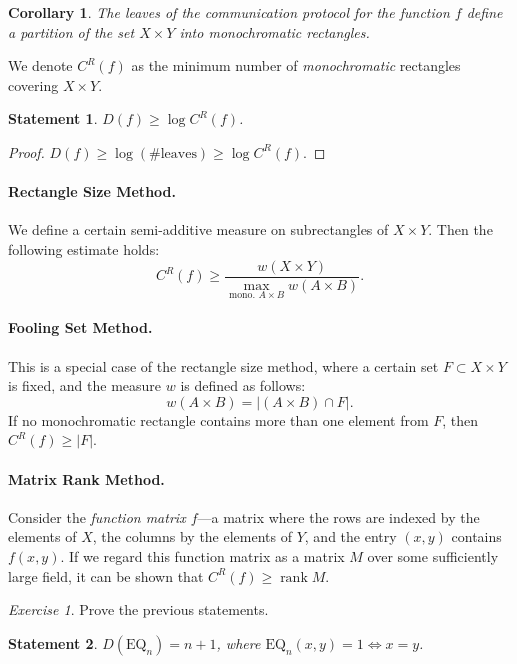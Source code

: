 \documentclass[12pt,sans]{article}
\DeclareMathOperator{\rank}{rank}
\theoremstyle{definition}
\theoremstyle{plain}
\newtheorem{statement}{Statement}[section]
\newtheorem{corollary}{Corollary}[section]
\theoremstyle{remark}
\newtheorem{exercise}{Exercise}[section]
\begin{document}
\begin{corollary}
    The leaves of the communication protocol for the function $f$ define a partition of the set $X \times Y$ into monochromatic rectangles.
\end{corollary}

We denote $C^R(f)$ as the minimum number of \emph{monochromatic} rectangles covering $X \times Y$.

\begin{statement}
    $D(f) \ge \log C^R(f)$.
\end{statement}

\begin{proof}
    $D(f) \ge \log (\text{\# leaves}) \ge \log C^R(f)$.
\end{proof}

\paragraph{Rectangle Size Method.} We define a certain semi-additive measure on subrectangles of $X \times Y$. Then the following estimate holds:
\[
C^R(f) \ge \frac{w(X \times Y)}{\max\limits_{\text{mono. } A \times B} w(A \times B)}.
\]

\paragraph{Fooling Set Method.} This is a special case of the rectangle size method, where a certain set $F \subset X \times Y$ is fixed, and the measure $w$ is defined as follows:
\[
w(A \times B) = |(A \times B) \cap F|.
\]
If no monochromatic rectangle contains more than one element from $F$, then $C^R(f) \ge |F|$.

\paragraph{Matrix Rank Method.} Consider the \emph{function matrix $f$}—a matrix where the rows are indexed by the elements of $X$, the columns by the elements of $Y$, and the entry $(x,y)$ contains $f(x,y)$. If we regard this function matrix as a matrix $M$ over some sufficiently large field, it can be shown that $C^R(f) \ge \rank M$.

\begin{exercise}
    Prove the previous statements.
\end{exercise}

\begin{statement}
    $D(\mathrm{EQ}_n) = n + 1$, where $\mathrm{EQ}_n(x,y) = 1 \iff x = y$.
\end{statement}
\end{document}
